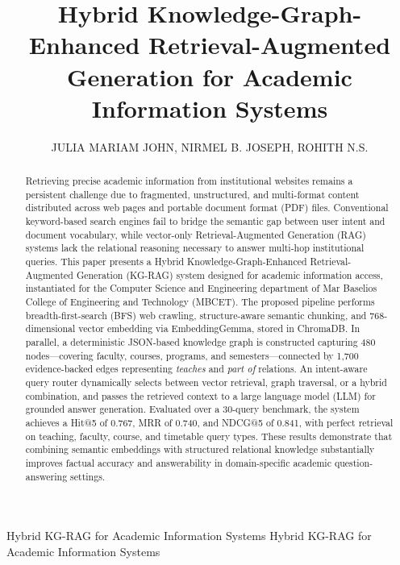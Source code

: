 \documentclass{ieeeaccess}
\begin{document}

\title{Hybrid Knowledge-Graph-Enhanced Retrieval-Augmented Generation for Academic Information Systems}

\author{
\uppercase{Julia Mariam John},
\uppercase{Nirmel B. Joseph},
\uppercase{Rohith N.S.}
}

\address[1]{Department of Computer Science \& Engineering, Mar Baselios College of Engineering and Technology, Thiruvananthapuram, India
(e-mail:juliamariamjohn.b23cs2137@mbcet.ac.in; nirmelbjoseph.b23cs2148@mbcet.ac.in; rohithns.b23cs2156@mbcet.ac.in)}


\markboth
{ Hybrid KG-RAG for Academic Information Systems}
{ Hybrid KG-RAG for Academic Information Systems}


\begin{abstract}
Retrieving precise academic information from institutional websites remains a persistent challenge due to fragmented, unstructured, and multi-format content distributed across web pages and portable document format (PDF) files. Conventional keyword-based search engines fail to bridge the semantic gap between user intent and document vocabulary, while vector-only Retrieval-Augmented Generation (RAG) systems lack the relational reasoning necessary to answer multi-hop institutional queries. This paper presents a Hybrid Knowledge-Graph-Enhanced Retrieval-Augmented Generation (KG-RAG) system designed for academic information access, instantiated for the Computer Science and Engineering department of Mar Baselios College of Engineering and Technology (MBCET). The proposed pipeline performs breadth-first-search (BFS) web crawling, structure-aware semantic chunking, and 768-dimensional vector embedding via EmbeddingGemma, stored in ChromaDB. In parallel, a deterministic JSON-based knowledge graph is constructed capturing 480 nodes---covering faculty, courses, programs, and semesters---connected by 1,700 evidence-backed edges representing \textit{teaches} and \textit{part of} relations. An intent-aware query router dynamically selects between vector retrieval, graph traversal, or a hybrid combination, and passes the retrieved context to a large language model (LLM) for grounded answer generation. Evaluated over a 30-query benchmark, the system achieves a Hit@5 of 0.767, MRR of 0.740, and NDCG@5 of 0.841, with perfect retrieval on teaching, faculty, course, and timetable query types. These results demonstrate that combining semantic embeddings with structured relational knowledge substantially improves factual accuracy and answerability in domain-specific academic question-answering settings.
\end{abstract}
\end{document}
